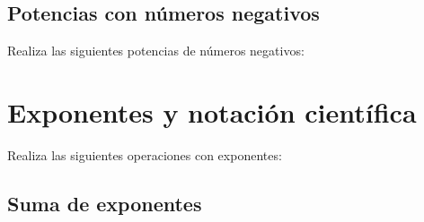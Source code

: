 \documentclass[12pt,addpoints]{evalua}
\begin{document}
\begin{questions}
\begin{multicols}{2}
\begin{parts}
            \end{parts}
      \end{multicols}

      
	\subsection{Potencias con números negativos}

      \question[4] Realiza las siguientes potencias de números negativos:
     
      \begin{multicols}{2}
      \end{multicols}


	\section{Exponentes y notación científica}

      \question[6] Realiza las siguientes operaciones con exponentes:
   
      \begin{multicols}{3}
            \begin{parts}
                  
	\subsection{Suma de exponentes}


\end{parts}
\end{multicols}
\end{questions}
\end{document}
